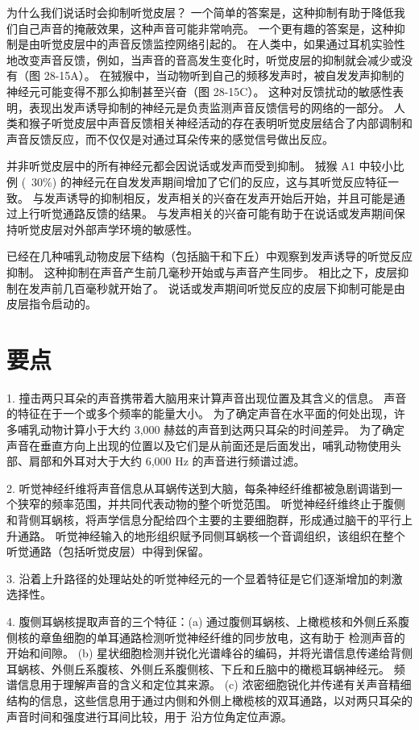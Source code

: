 为什么我们说话时会抑制听觉皮层？ 一个简单的答案是，这种抑制有助于降低我们自己声音的掩蔽效果，这种声音可能非常响亮。 一个更有趣的答案是，这种抑制是由听觉皮层中的声音反馈监控网络引起的。 在人类中，如果通过耳机实验性地改变声音反馈，例如，当声音的音高发生变化时，听觉皮层的抑制就会减少或没有（图 28-15A）。 在狨猴中，当动物听到自己的频移发声时，被自发发声抑制的神经元可能变得不那么抑制甚至兴奋（图 28-15C）。 这种对反馈扰动的敏感性表明，表现出发声诱导抑制的神经元是负责监测声音反馈信号的网络的一部分。 人类和猴子听觉皮层中声音反馈相关神经活动的存在表明听觉皮层结合了内部调制和声音反馈反应，而不仅仅是对通过耳朵传来的感觉信号做出反应。

并非听觉皮层中的所有神经元都会因说话或发声而受到抑制。 狨猴 A1 中较小比例 (~30\%) 的神经元在自发发声期间增加了它们的反应，这与其听觉反应特征一致。 与发声诱导的抑制相反，发声相关的兴奋在发声开始后开始，并且可能是通过上行听觉通路反馈的结果。 与发声相关的兴奋可能有助于在说话或发声期间保持听觉皮层对外部声学环境的敏感性。

已经在几种哺乳动物皮层下结构（包括脑干和下丘）中观察到发声诱导的听觉反应抑制。 这种抑制在声音产生前几毫秒开始或与声音产生同步。 相比之下，皮层抑制在发声前几百毫秒就开始了。 说话或发声期间听觉反应的皮层下抑制可能是由皮层指令启动的。


\section{要点}
1. 撞击两只耳朵的声音携带着大脑用来计算声音出现位置及其含义的信息。 声音的特征在于一个或多个频率的能量大小。 为了确定声音在水平面的何处出现，许多哺乳动物计算小于大约 3,000 赫兹的声音到达两只耳朵的时间差异。 为了确定声音在垂直方向上出现的位置以及它们是从前面还是后面发出，哺乳动物使用头部、肩部和外耳对大于大约 6,000 Hz 的声音进行频谱过滤。 

2. 听觉神经纤维将声音信息从耳蜗传送到大脑，每条神经纤维都被急剧调谐到一个狭窄的频率范围，并共同代表动物的整个听觉范围。 听觉神经纤维终止于腹侧和背侧耳蜗核，将声学信息分配给四个主要的主要细胞群，形成通过脑干的平行上升通路。 听觉神经输入的地形组织赋予同侧耳蜗核一个音调组织，该组织在整个听觉通路（包括听觉皮层）中得到保留。 

3. 沿着上升路径的处理站处的听觉神经元的一个显着特征是它们逐渐增加的刺激选择性。 

4. 腹侧耳蜗核提取声音的三个特征：(a) 通过腹侧耳蜗核、上橄榄核和外侧丘系腹侧核的章鱼细胞的单耳通路检测听觉神经纤维的同步放电，这有助于 检测声音的开始和间隙。 (b) 星状细胞检测并锐化光谱峰谷的编码，并将光谱信息传递给背侧耳蜗核、外侧丘系腹核、外侧丘系腹侧核、下丘和丘脑中的橄榄耳蜗神经元。 频谱信息用于理解声音的含义和定位其来源。 (c) 浓密细胞锐化并传递有关声音精细结构的信息，这些信息用于通过内侧和外侧上橄榄核的双耳通路，以对两只耳朵的声音时间和强度进行耳间比较，用于 沿方位角定位声源。 

